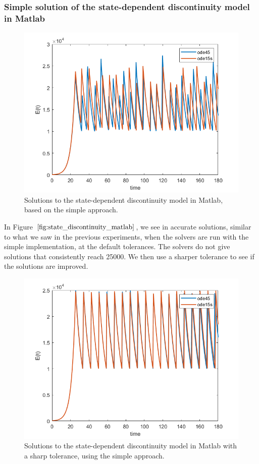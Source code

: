 \subsubsection{Simple solution of the state-dependent discontinuity model in Matlab}
\begin{figure}[H]
\centering
\includegraphics[width=0.7\linewidth]{./figures/state_discontinuity_matlab}
\caption{Solutions to the state-dependent discontinuity model in Matlab, based on the simple approach.}
\label{fig:state_discontinuity_matlab}
\end{figure}
In Figure $\ref{fig:state_discontinuity_matlab}$, we see in accurate solutions, similar to what we saw in the previous experiments, when the solvers are run with the simple implementation, at the default tolerances. The solvers do not give solutions that consistently reach 25000. We then use a sharper tolerance to see if the solutions are improved.

\begin{figure}[h]
\centering
\includegraphics[width=0.7\linewidth]{./figures/state_discontinuity_sharp_matlab}
\caption{Solutions to the state-dependent discontinuity model in Matlab with a sharp tolerance, using the simple approach.}
\label{fig:state_discontinuity_sharp_matlab}
\end{figure}

